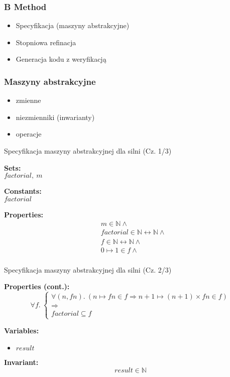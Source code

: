 \documentclass{beamer}
\begin{document}
\begin{frame}
\frametitle{B Method}
\begin{itemize}
\item Specyfikacja (maszyny abstrakcyjne)
\item Stopniowa refinacja
\item Generacja kodu z weryfikacją
\end{itemize}
\end{frame}

\begin{frame}
\frametitle{Maszyny abstrakcyjne}

\begin{itemize}
    \item zmienne
    \item niezmienniki (inwarianty)
    \item operacje
\end{itemize}
\end{frame}

\begin{frame}{Specyfikacja maszyny abstrakcyjnej dla silni (Cz. 1/3)}
\begin{tcolorbox}[colback=white, colframe=blue!30!black, title=Machine FACTORIAL\_MAC]
\textbf{Sets:} \\
$\textit{factorial},\ m$

\textbf{Constants:} \\
$\textit{factorial}$

\textbf{Properties:}
\[
\begin{aligned}
& m \in \mathbb{N} \land \\
& \textit{factorial} \in \mathbb{N} \leftrightarrow \mathbb{N} \land \\
& f \in \mathbb{N} \leftrightarrow \mathbb{N} \land \\
& 0 \mapsto 1 \in f \land \\
\end{aligned}
\]
\end{tcolorbox}
\end{frame}

\begin{frame}{Specyfikacja maszyny abstrakcyjnej dla silni (Cz. 2/3)}
\begin{tcolorbox}[colback=white, colframe=blue!30!black, title=Machine FACTORIAL\_MAC]
\textbf{Properties (cont.):}
\[
\forall f.\ \begin{cases}
\forall (n, fn).\ (n \mapsto fn \in f \Rightarrow n+1 \mapsto (n+1) \times fn \in f) \\
\Rightarrow \\
\textit{factorial} \subseteq f
\end{cases}
\]

\textbf{Variables:}
\begin{itemize}
    \item $\textit{result}$
\end{itemize}

\textbf{Invariant:}
\[
\textit{result} \in \mathbb{N}
\]
\end{tcolorbox}
\end{frame}
\end{document}
